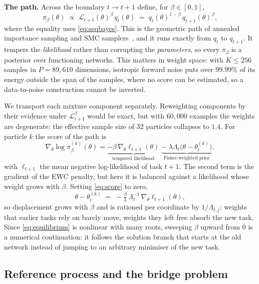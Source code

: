 \documentclass{article}
\newcommand{\Lh}{\mathcal{L}}
\newcommand{\thk}{\theta_t^{(k)}}
\begin{document}
\textbf{The path.} Across the boundary $t\to t+1$ define, for
$\beta\in[0,1]$,
\begin{equation}
\pi_\beta(\theta)\;\propto\;\Lh_{t+1}(\theta)^{\beta}\,q_t(\theta)
\;=\;q_t(\theta)^{1-\beta}\,q_{t+1}(\theta)^{\beta},
\label{eq:path}
\end{equation}
where the equality uses \eqref{eq:seqbayes}. This is the geometric path of
annealed importance sampling and SMC
samplers~\cite{neal2001ais,delmoral2006smc}, and it runs exactly from $q_t$ to
$q_{t+1}$. It tempers the \emph{likelihood} rather than corrupting the
\emph{parameters}, so every $\pi_\beta$ is a posterior over functioning
networks. This matters in weight space: with $K\le256$ samples in
$P=89{,}610$ dimensions, isotropic forward noise puts over $99.99\%$ of its
energy outside the span of the samples, where no score can be estimated, so a
data-to-noise construction cannot be inverted.

We transport each mixture component separately. Reweighting components by
their evidence under $\Lh_{t+1}^{\beta}$ would be exact, but with
$60{,}000$ examples the weights are degenerate: the effective sample size of
$32$ particles collapses to $1.4$. For particle $k$ the score of the path is
\begin{equation}
\nabla_\theta\log\pi^{(k)}_\beta(\theta)
=\underbrace{-\beta\,\nabla_\theta\ell_{t+1}(\theta)}_{\text{tempered likelihood}}
\;\underbrace{-\;\lambda\Lambda_t\big(\theta-\thk\big)}_{\text{Fisher-weighted prior}},
\label{eq:score}
\end{equation}
with $\ell_{t+1}$ the mean negative log-likelihood of task $t{+}1$. The second
term is the gradient of the EWC penalty, but here it is balanced against a
likelihood whose weight grows with $\beta$. Setting \eqref{eq:score} to zero,
\begin{equation}
\theta-\thk\;=\;-\tfrac{\beta}{\lambda}\,\Lambda_t^{-1}\,\nabla_\theta\ell_{t+1}(\theta),
\label{eq:equilibrium}
\end{equation}
so displacement grows with $\beta$ and is rationed per coordinate by
$1/\Lambda_{t,j}$: weights that earlier tasks rely on barely move, weights they
left free absorb the new task. Since \eqref{eq:equilibrium} is nonlinear with
many roots, sweeping $\beta$ upward from $0$ is a numerical continuation: it
follows the solution branch that starts at the old network instead of jumping
to an arbitrary minimiser of the new task.

\subsection{Reference process and the bridge problem}
\label{sec:reference}
\end{document}
